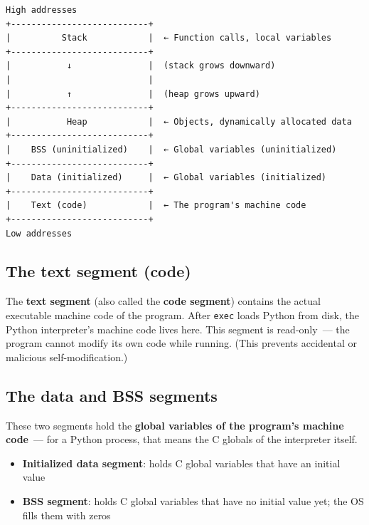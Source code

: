 \begin{outputbox}[short]
\begin{Verbatim}[fontsize=\codesize, breaklines, breakanywhere, breaksymbolleft={\tiny\textcolor{muted}{$\hookrightarrow$}}]
High addresses
+---------------------------+
|          Stack            |  ← Function calls, local variables
+---------------------------+
|           ↓               |  (stack grows downward)
|                           |
|           ↑               |  (heap grows upward)
+---------------------------+
|           Heap            |  ← Objects, dynamically allocated data
+---------------------------+
|    BSS (uninitialized)    |  ← Global variables (uninitialized)
+---------------------------+
|    Data (initialized)     |  ← Global variables (initialized)
+---------------------------+
|    Text (code)            |  ← The program's machine code
+---------------------------+
Low addresses
\end{Verbatim}
\end{outputbox}

\subsection*{The text segment (code)}\label{01-command-to-process:the-text-segment-code}

The \textbf{text segment} (also called the \textbf{code segment}) contains the actual executable machine code of the program. After \texttt{exec} loads Python from disk, the Python interpreter's machine code lives here. This segment is read-only~--- the program cannot modify its own code while running. (This prevents accidental or malicious self-modification.)

\subsection*{The data and BSS segments}\label{01-command-to-process:the-data-and-bss-segments}

These two segments hold the \textbf{global variables of the program's machine code}~--- for a Python process, that means the C globals of the interpreter itself.

\begin{itemize}
\tightlist
\item
  \textbf{Initialized data segment}: holds C global variables that have an initial value
\item
  \textbf{BSS segment}: holds C global variables that have no initial value yet; the OS fills them with zeros
\end{itemize}

